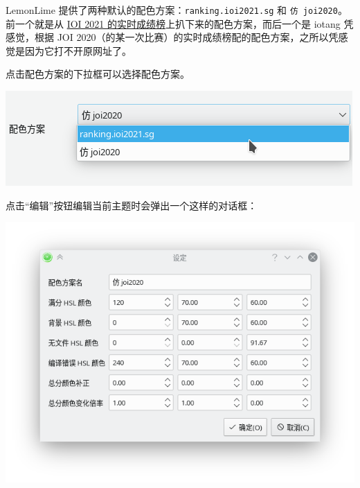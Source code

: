 \documentclass[UTF-8]{ctexart}
\begin{document}
				LemonLime 提供了两种默认的配色方案：\texttt{ranking.ioi2021.sg} 和 \texttt{仿 joi2020}。前一个就是从 \href{https://ranking.ioi2021.sg/}{IOI 2021 的实时成绩榜}上扒下来的配色方案，而后一个是 iotang 凭感觉，根据 JOI 2020（的某一次比赛）的实时成绩榜配的配色方案，之所以凭感觉是因为它打不开原网址了。%
				
				点击配色方案的下拉框可以选择配色方案。
				
				\begin{center}
					\includegraphics[scale=0.7]{pics/visualmainsettings_whenchoosingtheme.png}
				\end{center}
			
				点击“编辑”按钮编辑当前主题时会弹出一个这样的对话框：
			
				\begin{center}
					\includegraphics[scale=0.7]{pics/visualsettings.png}
				\end{center}
			
\end{document}
